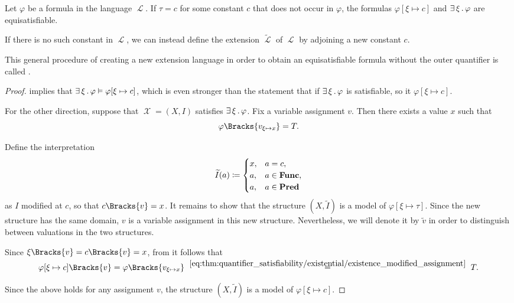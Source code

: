 \begin{proposition}\label{thm:existential_quantifier_removal}
  Let \( \varphi \) be a formula in the language \( \mscrL \). If \( \tau = c \) for some constant \( c \) that does not occur in \( \varphi \), the formulas \( \varphi[\xi \mapsto c] \) and \( \exists \thinspace \xi \thinspace . \thinspace \varphi \) are equisatisfiable.

  If there is no such constant in \( \mscrL \), we can instead define the extension \( \widetilde \mscrL \) of \( \mscrL \) by adjoining a new constant \( c \).

  This general procedure of creating a new extension language in order to obtain an equisatisfiable formula without the outer quantifier is called .
\end{proposition}
\begin{proof}
   implies that \( \exists \thinspace \xi \thinspace . \thinspace \varphi \vDash \varphi[\xi \mapsto c] \), which is even stronger than the statement that if \( \exists \thinspace \xi \thinspace . \thinspace \varphi \) is satisfiable, so it \( \varphi[\xi \mapsto c] \).

  For the other direction, suppose that \( \mscrX = (X, I) \) satisfies \( \exists \thinspace \xi \thinspace . \thinspace \varphi \). Fix a variable assignment \( v \). Then there exists a value \( x \) such that
  \begin{equation}\label{eq:thm:quantifier_satisfiability/existential/existence_modified_assignment}
    \varphi\Bracks{v_{\xi \mapsto x}} = T.
  \end{equation}

  Define the interpretation
  \begin{equation*}
    \widetilde I (a) \coloneqq \begin{cases}
      x, &a = c, \\
      a, &a \in \operatorname{\mathbf{Func}}, \\
      a, &a \in \operatorname{\mathbf{Pred}}
    \end{cases}
  \end{equation*}
  as \( I \) modified at \( c \), so that \( c\Bracks{v} = x \). It remains to show that the structure \( (X, \widetilde I) \) is a model of \( \varphi[\xi \mapsto \tau] \). Since the new structure has the same domain, \( v \) is a variable assignment in this new structure. Nevertheless, we will denote it by \( \widetilde v \) in order to distinguish between valuations in the two structures.

  Since \( \xi\Bracks{v} = c\Bracks{v} = x \), from  it follows that
  \begin{equation*}
    \varphi[\xi \mapsto c]\Bracks{v} = \varphi\Bracks{v_{\xi \mapsto x}} \reloset{\eqref{eq:thm:quantifier_satisfiability/existential/existence_modified_assignment}} = T.
  \end{equation*}

  Since the above holds for any assignment \( v \), the structure \( (X, \widetilde I) \) is a model of \( \varphi[\xi \mapsto c] \).
\end{proof}

